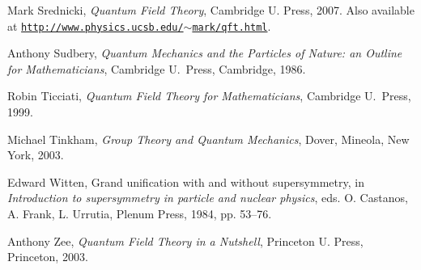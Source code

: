 \documentclass[12pt]{article}
\begin{document}
\begin{thebibliography}{99}
Mark Srednicki, {\em {Quantum Field Theory}}, Cambridge U. Press, 2007.
Also available at \href{http://www.physics.ucsb.edu/$\sim$mark/qft.html}
{\texttt{http://www.physics.ucsb.edu/$\sim$mark/qft.html}}.

Anthony Sudbery, {\em {Quantum Mechanics and the Particles of Nature: 
an Outline for Mathematicians}}, Cambridge U.\ Press, Cambridge, 1986.

Robin Ticciati, {\em {Quantum Field Theory for Mathematicians}}, Cambridge U.\
Press, 1999.

Michael Tinkham, {\em {Group Theory and Quantum Mechanics}}, 
Dover, Mineola, New York, 2003.

Edward Witten, Grand unification with and without supersymmetry, in {\em
{Introduction to supersymmetry in particle and nuclear physics}}, eds. O.
Castanos, A. Frank, L. Urrutia, Plenum Press, 1984, pp. 53--76.

Anthony Zee, {\em {Quantum Field Theory in a Nutshell}}, Princeton U. Press,
Princeton, 2003.

\end{thebibliography}
\end{document}
